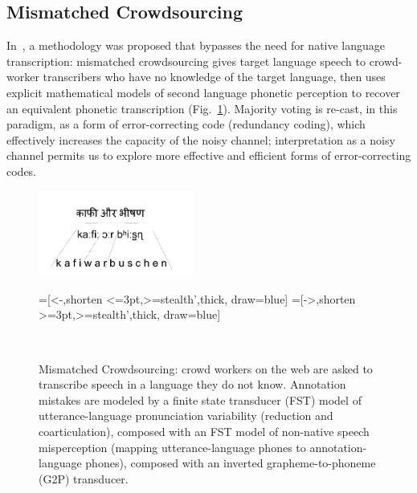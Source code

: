 \subsection{Mismatched Crowdsourcing}
\label{sec:bgmc}

In~\cite{JHJ15a}, a methodology was proposed that bypasses the need
for native language transcription: mismatched crowdsourcing gives target
language speech to crowd-worker transcribers who have no
knowledge of the target language, then uses explicit mathematical
models of second language phonetic perception to recover an equivalent
phonetic transcription (Fig.~\ref{fig:h2e_eg2}).  Majority voting is
re-cast, in this paradigm, as a form of error-correcting code
(redundancy coding), which effectively increases the capacity of the
noisy channel; interpretation as a noisy channel permits us to explore
more effective and efficient forms of error-correcting codes.

\begin{figure}[b!]\setlength{\textfloatsep}{3mm}
\centerline{\includegraphics[width=2in]{../figs/h2e_eg1.png}}
\begin{center}
  =[<-,shorten <=3pt,>=stealth',thick, draw=blue]
  =[->,shorten >=3pt,>=stealth',thick, draw=blue]
  \\
\end{center}
\setlength{\abovecaptionskip}{0pt}
\caption{Mismatched Crowdsourcing: crowd workers on the web are asked
  to transcribe speech in a language they do not know.  Annotation
  mistakes are modeled by a finite state transducer (FST) model of
  utterance-language pronunciation variability (reduction and
  coarticulation), composed with an FST model of non-native speech
  misperception (mapping utterance-language phones to
  annotation-language phones), composed with an inverted
  grapheme-to-phoneme (G2P) transducer.}
\label{fig:h2e_eg2}
\end{figure}

